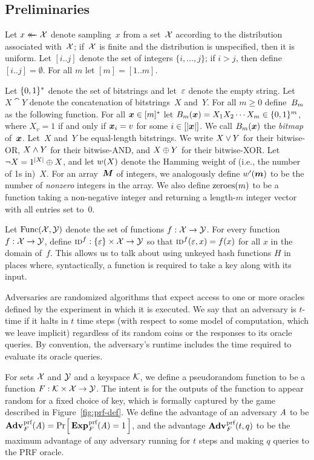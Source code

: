 \subsection{Preliminaries}
\label{sec:prelims}

Let $x \mathrel{\leftarrow\mkern-14mu\leftarrow} \mathcal{X}$ denote sampling~$x$ from a set~$\mathcal{X}$ according to the
distribution associated with~$\mathcal{X}$; if~$\mathcal{X}$ is finite and the distribution
is unspecified, then it is uniform.
%
Let $[i..j]$ denote the set of integers $\{i, \ldots, j\}$; if $i > j$, then
define $[i..j] = \emptyset$. For all $m$ let $[m] = [1..m]$.

Let $\{0,1\}^*$ denote the set of bitstrings and let~$\varepsilon$ denote the empty
string.
%
Let $X \cat Y$ denote the concatenation of bitstrings~$X$ and~$Y$.
%
For all $m\geq0$ define~${B}_m$ as the following function.  For all
$\v.x\in[m]^*$ let $\bmap_m(\v.x) = X_1X_2\cdots X_m\in\bits^m$, where
$X_v=1$ if and only if $\v.x_i = v$ for some $i\in[|\v.x|]$.
%
We call $\bmap_m(\v.x)$ the \emph{bitmap} of~$\v.x$.
%
Let~$X$ and~$Y$ be equal-length bitstrings. We write $X \vee Y$ for their
bitwise-OR, $X \wedge Y$ for their bitwise-AND, and $X \mathbin{\oplus} Y$ for their
bitwise-XOR. Let $\neg X = 1^{|X|} \mathbin{\oplus} X$, and let ${w}(X)$ denote the Hamming
weight of (i.e., the number of 1s in)~$X$.
%
For an array~$\v.M$ of integers, we analogously define $\hw'(\v.m)$ to be the number
of \emph{nonzero} integers in the array. We also define $\mathrm{zeroes}(m)$ to be a
function taking a non-negative integer and returning a length-$m$ integer vector
with all entries set to~$0$.

Let $\mathrm{Func}(\mathcal{X},\mathcal{Y})$ denote the set of functions $f:\mathcal{X}\to\mathcal{Y}$.
%
For every function~$f: \mathcal{X} \to \mathcal{Y}$, define $\textnormal{\textsc{id}}^f: \{\varepsilon\} \times \mathcal{X} \to \mathcal{Y}$ so that
$\textnormal{\textsc{id}}^f(\varepsilon, x) = f(x)$ for all $x$ in the domain
of~$f$. This allows us to talk about using unkeyed hash functions $H$ in places where,
syntactically, a function is required to take a key along with its input.

Adversaries are randomized algorithms that expect access to one or more oracles
defined by the experiment in which it is executed. We say that an adversary is
$t$-time if it halts in $t$ time steps (with respect to some model of
computation, which we leave implicit) regardless of its random coins or the
responses to its oracle queries. By convention, the adversary's runtime includes
the time required to evaluate its oracle queries.

%
For sets $\mathcal{X}$ and $\mathcal{Y}$ and a keyspace $\mathcal{K}$, we define a pseudorandom
function to be a function $F: \mathcal{K} \times \mathcal{X} \to \mathcal{Y}$. The intent is for
the outputs of the function to appear random for a fixed choice of key, which is
formally captured by the game described in Figure~\ref{fig:prf-def}. We define
the advantage of an adversary $\mathit{A}$ to be
$\Adv{\prf}_F(\advA) = \Prob{\Exp{\prf}_F(\advA) = 1}$, and the advantage
$\Adv{\prf}_F(t,q)$ to be the maximum advantage of any adversary running for $t$
steps and making $q$ queries to the PRF oracle.


